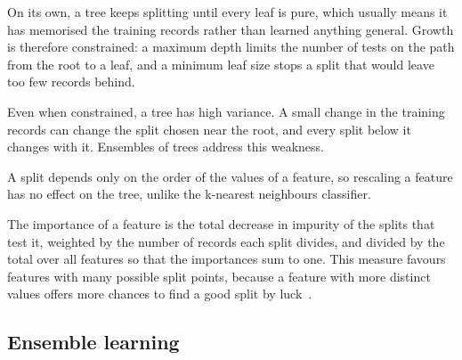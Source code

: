 \documentclass[conference,10pt]{IEEEtran}
\begin{document}
On its own, a tree keeps splitting until every leaf is pure, which usually
means it has memorised the training records rather than learned anything
general. Growth is therefore constrained: a maximum depth limits the number of tests on the path from the root to a leaf, and a minimum leaf size stops a split that would leave
too few records behind.

Even when constrained, a tree has high variance. A small change in the
training records can change the split chosen near the root, and every split
below it changes with it.  Ensembles of trees address this weakness.

A split depends only on the order of the values of a feature, so rescaling a
feature has no effect on the tree, unlike the k-nearest neighbours
classifier.

The importance of a feature is the total decrease in impurity of the splits
that test it, weighted by the number of records each split divides, and
divided by the total over all features so that the importances sum to one.
This measure favours features with many possible split points, because a
feature with more distinct values offers more chances to find a good split
by luck~\cite{strobl2007bias}.

\subsection{Ensemble learning}
\label{subsec:bg_ensemble}
%
\end{document}
